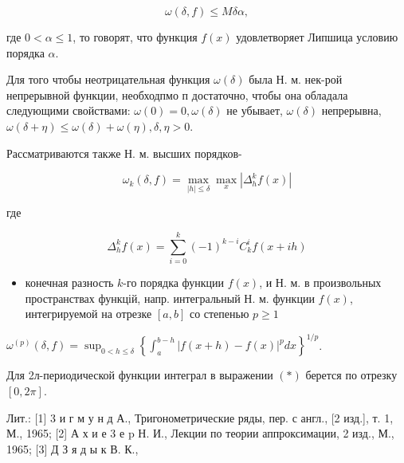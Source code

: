\documentclass[10pt]{article}
\begin{document}
\[

\omega(\delta, f) \leqslant M \delta \alpha,

\]



где $0<\alpha \leqslant 1$, то говорят, что функция $f(x)$ удовлетворяет Липшица условию порядка $\alpha$.



Для того чтобы неотрицательная функция $\omega(\delta)$ была Н. м. нек-рой непрерывной функции, необходпмо п достаточно, чтобы она обладала следующими свойствами: $\omega(0)=0, \omega(\delta)$ не убывает, $\omega(\delta)$ непрерывна, $\omega(\delta+\eta) \leqslant \omega(\delta)+\omega(\eta), \delta, \eta>0$.



Рассматриваются также Н. м. высших порядков-



\[

\omega_{k}(\delta, f)=\max _{|h| \leqslant \delta} \max _{x}\left|\Delta_{h}^{k} f(x)\right|

\]



где



\[

\Delta_{h}^{k} f(x)=\sum_{i=0}^{k}(-1)^{k-i} C_{k}^{i} f(x+i h)

\]



\begin{itemize}

  \item конечная разность $k$-го порядка функции $f(x)$, и Н. м. в произвольных пространствах функцій, напр. интегральный Н. м. функции $f(x)$, интегрируемой на отрезке $[a, b]$ со степенью $p \geqslant 1$

\end{itemize}



$\omega^{(p)}(\delta, f)=\sup _{0<h \leqslant \delta}\left\{\int_{a}^{b-h}|f(x+h)-f(x)|^{p} d x\right\}^{1 / p}$.



Для 2л-периодической функции интеграл в выражении $(*)$ берется по отрезку $[0,2 \pi]$.



Лит.: [1] 3 и г м у н д А., Тригонометрические ряды, пер. с англ., [2 изд.], т. 1, М., 1965; [2] А х и е 3 е p Н. И., Лекции по теории аппроксимации, 2 изд., М., 1965; [3] Д З я д ы к В. К.,
\end{document}
